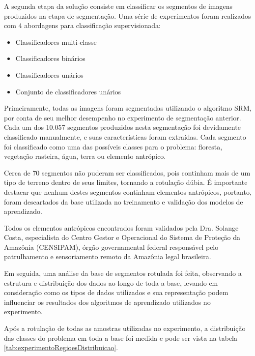 A segunda etapa da solução consiste em classificar os segmentos de imagens produzidos na etapa de segmentação. Uma série de experimentos foram realizados com 4 abordagens para classificação supervisionada:

\begin{itemize}
	\item Classificadores multi-classe
	\item Classificadores binários
	\item Classificadores unários
	\item Conjunto de classificadores unários
\end{itemize}

Primeiramente, todas as imagens foram segmentadas utilizando o algoritmo SRM, por conta de seu melhor desempenho no experimento de segmentação anterior. Cada um dos 10.057 segmentos produzidos nesta segmentação foi devidamente classificado manualmente, e suas características foram extraídas. Cada segmento foi classificado como uma das possíveis classes para o problema: floresta, vegetação rasteira, água, terra ou elemento antrópico.

Cerca de 70 segmentos não puderam ser classificados, pois continham mais de um tipo de terreno dentro de seus limites, tornando a rotulação dúbia. É importante destacar que nenhum destes segmentos continham elementos antrópicos, portanto, foram descartados da base utilizada no treinamento e validação dos modelos de aprendizado.

Todos os elementos antrópicos encontrados foram validados pela Dra. Solange Costa, especialista do Centro Gestor e Operacional do Sistema de Proteção da Amazônia (CENSIPAM), órgão governamental federal responsável pelo patrulhamento e sensoriamento remoto da Amazônia legal brasileira.

Em seguida, uma análise da base de segmentos rotulada foi feita, observando a estrutura e distribuição dos dados ao longo de toda a base, levando em consideração como os tipos de dados utilizados e sua representação podem influenciar os resultados dos algoritmos de aprendizado utilizados no experimento.

Após a rotulação de todas as amostras utilizadas no experimento, a distribuição das classes do problema em toda a base foi medida e pode ser vista na tabela \ref{tab:experimentoRegioesDistribuicao}.

